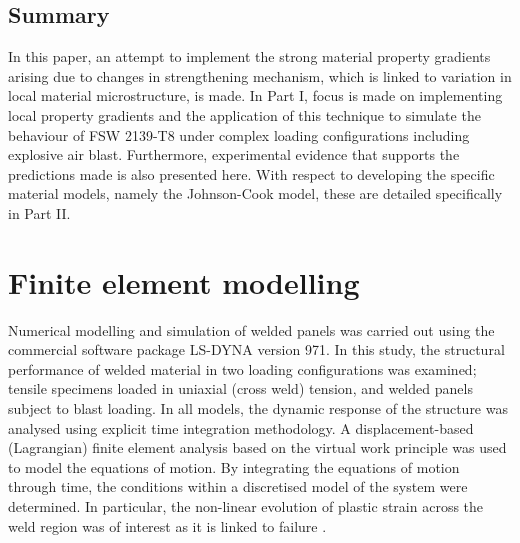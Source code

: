\subsection{Summary}
\label{IntroSummary}
In this paper, an attempt to implement the strong material property gradients arising due to changes in strengthening mechanism, which is linked to variation in local material microstructure, is made. In Part I, focus is made on implementing local property gradients and the application of this technique to simulate the behaviour of FSW 2139-T8 under complex loading configurations including explosive air blast. Furthermore, experimental evidence that supports the predictions made is also presented here. With respect to developing the specific material models, namely the Johnson-Cook model, these are detailed specifically in Part II. 

\section{Finite element modelling}
\label{FE}
Numerical modelling and simulation of welded panels was carried out using the commercial software package LS-DYNA version 971. In this study, the structural performance of welded material in two loading configurations was examined;  tensile specimens loaded in uniaxial (cross weld) tension, and welded panels subject to blast loading. In all models, the dynamic response of the structure was analysed using explicit time integration methodology. A displacement-based (Lagrangian) finite element analysis based on the virtual work principle was used to model the equations of motion. By integrating the equations of motion through time, the conditions within a discretised model of the system were determined. In particular, the non-linear evolution of plastic strain across the weld region was of interest as it is linked to failure \cite{Chien2003f}. 
